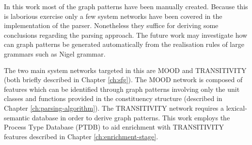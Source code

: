 In this work most of the graph patterns have been manually created. Because this is laborious exercise only a few system networks have been covered in the implementation of the parser. Nonetheless they suffice for deriving some conclusions regarding the parsing approach. The future work may investigate how can graph patterns be generated automatically from the realisation rules of large grammars such as Nigel grammar. 

The two main system networks targeted in this are MOOD and TRANSITIVITY (both briefly described in Chapter \ref{ch:sfg}). The MOOD network is composed of features which can be identified through graph patterns involving only the unit classes and functions provided in the constituency structure (described in Chapter \ref{ch:parsing-algorithm}). The TRANSITIVITY network requires a lexical-semantic database in order to derive graph patterns. This work employs the Process Type Database (PTDB) \citep{Neale2002} to aid enrichment with TRANSITIVITY features described in Chapter \ref{ch:enrichment-stage}.  









